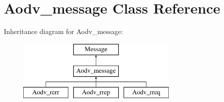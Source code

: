 \hypertarget{class_aodv__message}{}\section{Aodv\+\_\+message Class Reference}
\label{class_aodv__message}
Inheritance diagram for Aodv\+\_\+message\+:\begin{figure}[H]
\begin{center}
\leavevmode
\includegraphics[height=3.000000cm]{class_aodv__message}
\end{center}
\end{figure}
